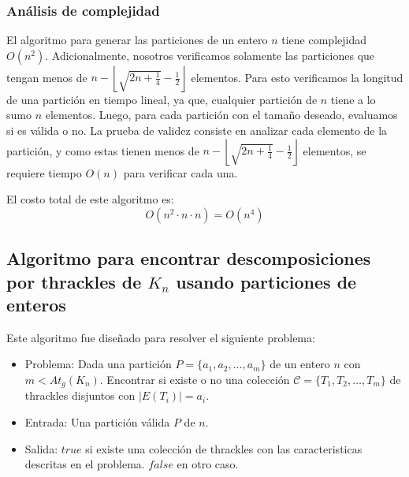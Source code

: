     \subsubsection{Análisis de complejidad}

    El algoritmo para generar las particiones de un entero $n$ tiene complejidad
    $O(n^2)$. Adicionalmente, nosotros verificamos solamente las particiones que tengan
    menos de $n - \left\lfloor\sqrt{2n + \frac{1}{4}} - \frac{1}{2}\right\rfloor$
    elementos. Para esto verificamos la longitud de una partición en tiempo lineal, ya
    que, cualquier partición de $n$ tiene a lo sumo $n$ elementos. Luego, para cada
    partición con el tamaño deseado, evaluamos si es válida o no. La prueba de validez
    consiste en analizar cada elemento de la partición, y como estas tienen menos de $n -
    \left\lfloor\sqrt{2n + \frac{1}{4}} - \frac{1}{2}\right\rfloor$ elementos, se
    requiere tiempo $O(n)$ para verificar cada una.

    El costo total de este algoritmo es: \[ O(n^2\cdot n \cdot n) = O(n^4)\]

\subsection{Algoritmo para encontrar descomposiciones por thrackles de $K_n$
usando particiones de enteros}\label{secc:descomposiciones_particiones}

Este algoritmo fue diseñado para resolver el siguiente problema:
\begin{itemize}
  \item[] Problema: Dada una partición $P=\{a_1,a_2,\dots,a_m\}$ de un entero $n$ con
  $m < At_g(K_n)$. Encontrar si existe o no una colección
  $\mathcal{C}=\{T_1,T_2,\dots,T_m\}$ de thrackles disjuntos con $|E(T_i)| = a_i$.
  \item[] Entrada: Una partición válida $P$ de $n$.
  \item[] Salida: $true$ si existe una colección de thrackles con las caracteristicas
  descritas en el problema. $false$ en otro caso.
\end{itemize}

